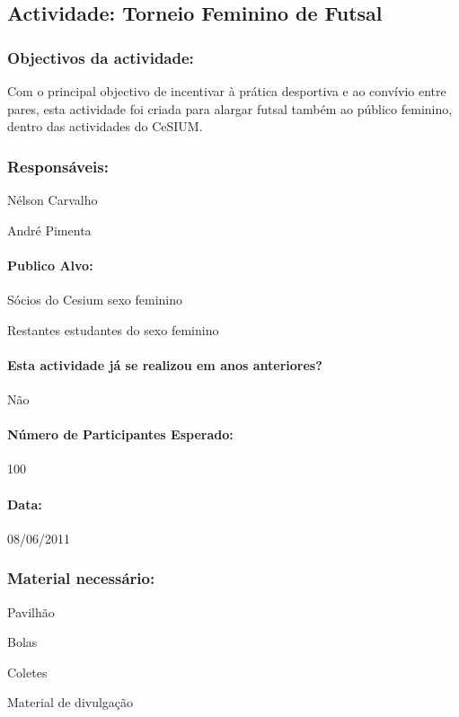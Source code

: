 \subsection{Actividade: Torneio Feminino de Futsal} 

\subsubsection*{Objectivos da actividade:}
Com o principal objectivo de incentivar à prática desportiva e ao convívio entre pares, esta actividade foi criada para alargar futsal também ao público feminino, dentro das actividades do CeSIUM.
\subsubsection*{Responsáveis:}
\begin{itemizedash}
	\item{Nélson Carvalho}
	\item{André Pimenta}
\end{itemizedash}

\paragraph{Publico Alvo: }
\begin{itemizedash}
     \item{Sócios do Cesium sexo feminino}
     \item{Restantes estudantes do sexo feminino}
\end{itemizedash}

\paragraph{Esta actividade já se realizou em anos anteriores?}
Não

\paragraph{Número de Participantes Esperado:}
100

\paragraph{Data:} 08/06/2011

\subsubsection*{Material necessário:}
\begin{itemizedash}
	\item{Pavilhão}
	\item{Bolas}
	\item{Coletes}
	\item{Material de divulgação}
\end{itemizedash}

